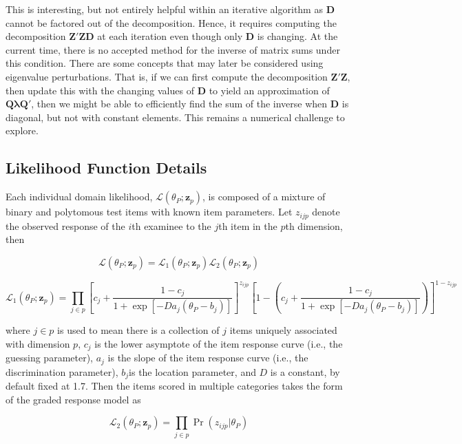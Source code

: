 \documentclass[12pt]{article}
\begin{document}
This is interesting, but not entirely helpful within an iterative algorithm as $\bm{D}$ cannot be factored out of the decomposition. Hence, it requires computing the decomposition $\bm{Z}'\bm{Z}\bm{D}$ at each iteration even though only $\bm{D}$ is changing. At the current time, there is no accepted method for the inverse of matrix sums under this condition. There are some concepts that may later be considered using eigenvalue perturbations. That is, if we can first compute the decomposition $\bm{Z}'\bm{Z}$, then update this with the changing values of $\bm{D}$ to yield an approximation of $\bm{Q} \bm{\lambda} \bm{Q}'$, then we might be able to efficiently find the sum of the inverse when $\bm{D}$ is diagonal, but not with constant elements. This remains a numerical challenge to explore.

\subsection*{Likelihood Function Details}

Each individual domain likelihood, $\mathcal{L}(\theta_P;\bm{z}_p)$, is composed of a mixture of binary and polytomous test items with known item parameters. Let $z_{ijp}$ denote the observed response of the $i$th examinee to the $j$th item in the $p$th dimension, then

\begin{equation}
\mathcal{L}(\theta_P;\bm{z}_p) = \mathcal{L}_1(\theta_P;\bm{z}_p)\mathcal{L}_2(\theta_P;\bm{z}_p)\nonumber
\end{equation}

\begin{equation}
\mathcal{L}_1(\theta_P;\bm{z}_p) = \prod_{j \in p}\left[c_j+\frac{1-c_j}{1+\exp[-Da_j(\theta_P-b_j)]}\right]^{z_{ijp}}\left[1-\left(c_j+\frac{1-c_j}{1+\exp[-Da_j(\theta_P-b_j)]}\right)\right]^{1-z_{ijp}}\nonumber
\end{equation}

\noindent where $j \in p$ is used to mean there is a collection of $j$ items uniquely associated with dimension $p$, $c_j$ is the lower asymptote of the item response curve (i.e., the guessing parameter), $a_j$ is the slope of the item response curve (i.e., the discrimination parameter), $b_j$is the location parameter, and $D$ is a constant, by default fixed at 1.7. Then the items scored in multiple categories takes the form of the graded response model as

\begin{equation}
\mathcal{L}_2(\theta_P;\bm{z}_p) = \prod_{j \in p}\Pr(z_{ijp}|\theta_P)\nonumber
\end{equation}
\end{document}
